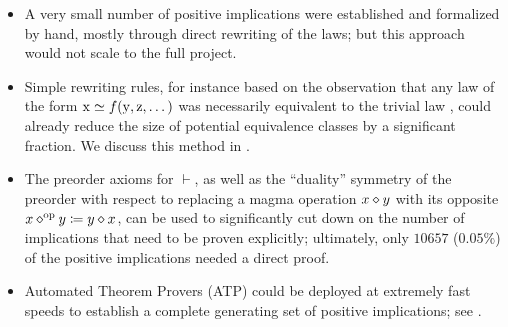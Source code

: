 \begin{itemize}
    \item A very small number of positive implications were established and formalized by hand, mostly through direct rewriting of the laws; but this approach would not scale to the full project.
    \item Simple rewriting rules, for instance based on the observation that any law of the form $\mathrm{x} \simeq f(\mathrm{y},\mathrm{z},\dots)$ was necessarily equivalent to the trivial law , could already reduce the size of potential equivalence classes by a significant fraction. We discuss this method in .
    \item The preorder axioms for $\vdash$, as well as the ``duality'' symmetry of the preorder with respect to replacing a magma operation $x \diamond y$ with its opposite $x \diamond^{\mathrm{op}} y \coloneqq y \diamond x$, can be used to significantly cut down on the number of implications that need to be proven explicitly; ultimately, only $10657$ ($0.05\%$) of the positive implications needed a direct proof.
    \item Automated Theorem Provers (ATP) could be deployed at extremely fast speeds to establish a complete generating set of positive implications; see .
\end{itemize}

